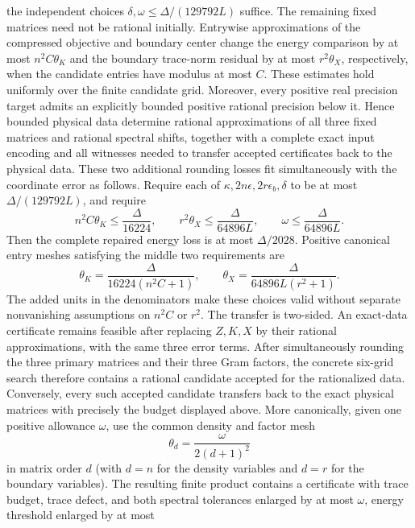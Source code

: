 \begin{lemma}
    the independent choices
    $\delta,\omega\le\Delta/(129792L)$ suffice.
    The remaining fixed matrices need not be rational initially.  Entrywise
    approximations of the compressed objective and boundary center change the
    energy comparison by at most $n^2C\theta_K$ and the boundary trace-norm
    residual by at most $r^2\theta_X$, respectively, when the candidate entries
    have modulus at most $C$.  These estimates hold uniformly over the finite
    candidate grid.  Moreover, every positive real precision target admits an
    explicitly bounded positive rational precision below it.  Hence bounded
    physical data determine rational approximations of all three fixed matrices
    and rational spectral shifts, together with a complete exact input encoding
    and all witnesses needed to transfer accepted certificates back to the
    physical data.  These two additional rounding losses fit simultaneously
    with the coordinate error as follows.  Require each of
    $\kappa,2n\epsilon,2r\epsilon_b,\delta$ to be at most
    $\Delta/(129792L)$, and require
    \[
        n^2C\theta_K\le \frac{\Delta}{16224},\qquad
        r^2\theta_X\le \frac{\Delta}{64896L},\qquad
        \omega\le \frac{\Delta}{64896L}.
    \]
    Then the complete repaired energy loss is at most $\Delta/2028$.
    Positive canonical entry meshes satisfying the middle two requirements are
    \[
        \theta_K=\frac{\Delta}{16224(n^2C+1)},\qquad
        \theta_X=\frac{\Delta}{64896L(r^2+1)}.
    \]
    The added units in the denominators make these choices valid without
    separate nonvanishing assumptions on $n^2C$ or $r^2$.
    The transfer is two-sided.  An exact-data certificate remains feasible
    after replacing $Z,K,X$ by their rational approximations, with the same
    three error terms.  After simultaneously rounding the three primary
    matrices and their three Gram factors, the concrete six-grid search
    therefore contains a rational candidate accepted for the rationalized
    data.  Conversely, every such accepted candidate transfers back to the
    exact physical matrices with precisely the budget displayed above.
    More canonically, given one positive allowance $\omega$, use the common
    density and factor mesh
    \[
        \theta_d=\frac{\omega}{2(d+1)^2}
    \]
    in matrix order $d$ (with $d=n$ for the density variables and $d=r$ for
    the boundary variables).  The resulting finite product contains a
    certificate with trace budget, trace defect, and both spectral tolerances
    enlarged by at most $\omega$, energy threshold enlarged by at most

\end{lemma}

